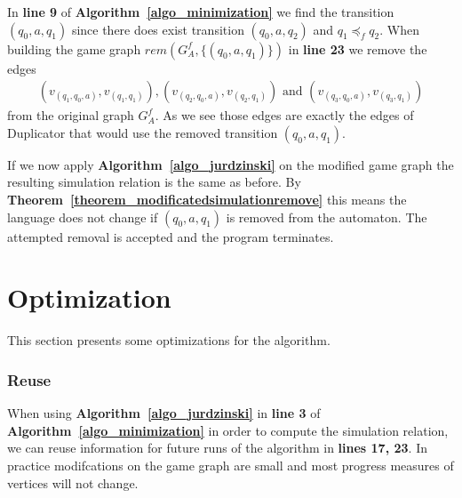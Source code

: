\documentclass[12pt,oneside,bibliography=totoc,abstracton]{scrartcl}
\newcommand{\theoremref}[1]{\textbf{Theorem~\ref{#1}}}
\newcommand{\algoref}[1]{\textbf{Algorithm~\ref{#1}}}
\begin{document}
In \textbf{line 9} of \algoref{algo_minimization} we find the transition $(q_0, a, q_1)$ since
there does exist transition $(q_0, a, q_2)$ and $q_1 \preceq_f q_2$.
When building the game graph $rem(G^f_A, \{(q_0, a, q_1)\})$ in \textbf{line 23} we
remove the edges
\begin{align*}
	(v_{(q_1, q_0, a)}, v_{(q_1, q_1)}), (v_{(q_2, q_0, a)}, v_{(q_2, q_1)})
	\text{ and } (v_{(q_3, q_0, a)}, v_{(q_3, q_1)})
\end{align*}
from the original graph $G^f_A$.
As we see those edges are exactly the edges of Duplicator that would use
the removed transition $(q_0, a, q_1)$.

If we now apply \algoref{algo_jurdzinski} on the modified game graph the resulting simulation
relation is the same as before. By \theoremref{theorem_modificatedsimulationremove}
this means the language does not change if $(q_0, a, q_1)$ is removed from the automaton.
The attempted removal is accepted and the program terminates.

\section{Optimization}\label{section_optimization}
This section presents some optimizations for the algorithm.

\subsubsection*{Reuse}
When using \algoref{algo_jurdzinski} in \textbf{line 3} of \algoref{algo_minimization} in order to
compute the simulation relation, we can reuse information for future runs of the algorithm in \textbf{lines 17, 23}.
In practice modifcations on the game graph are small and most progress measures of vertices will not change.
\end{document}
